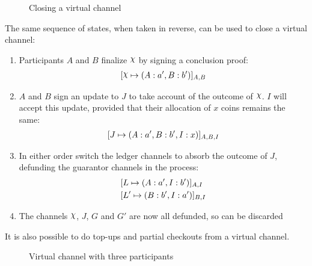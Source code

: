 \begin{figure}[ht]\centering
  \makebox[\textwidth][c]{}
  \caption{Closing a virtual channel}
  \label{fig:virtual-channel-closing}
\end{figure}

The same sequence of states, when taken in reverse, can be used to close a virtual channel:
\begin{enumerate}
  \item Participants $A$ and $B$ finalize $\rchi$ by signing a conclusion proof:
  \begin{align}
    \finalizable{\rchi}{\alloc{A:a', B:b'}}{A,B}
  \end{align}
  \item $A$ and $B$ sign an update to $J$ to take account of the outcome of $\rchi$. $I$ will accept this update, provided that their allocation of $x$ coins remains the same:
  \begin{align}
    [J \mapsto ( A: a', B:b', I: x )]_{A, B, I}
  \end{align}
  \item In either order switch the ledger channels to absorb the outcome of $J$, defunding the guarantor channels in the process:
  \begin{align}
    & [L \mapsto ( A: a', I: b' )]_{A,I} \\
    & [L' \mapsto ( B: b', I: a' )]_{B,I}
  \end{align}
  \item The channels $\rchi$, $J$, $G$ and $G'$ are now all defunded, so can be discarded
\end{enumerate}

It is also possible to do top-ups and partial checkouts from a virtual channel.

\begin{figure}[ht] \centering
  \makebox[\textwidth][c]{}
  \caption{Virtual channel with three participants}
  \label{fig:virtual-channel-three-participants}
\end{figure}
